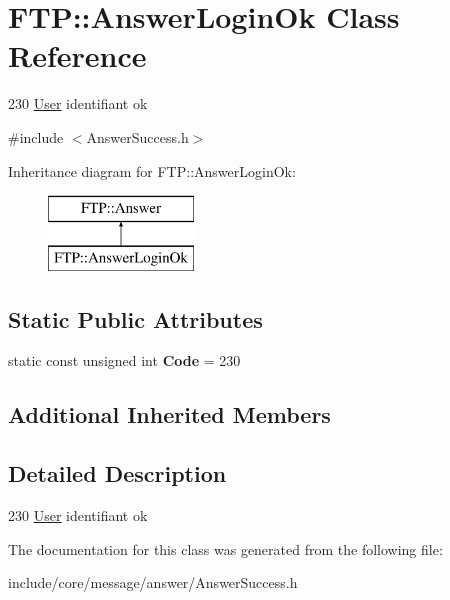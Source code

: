 \hypertarget{class_f_t_p_1_1_answer_login_ok}{\section{F\-T\-P\-:\-:Answer\-Login\-Ok Class Reference}
\label{class_f_t_p_1_1_answer_login_ok}
}


230 \hyperlink{struct_f_t_p_1_1_user}{User} identifiant ok  




{\ttfamily \#include $<$Answer\-Success.\-h$>$}

Inheritance diagram for F\-T\-P\-:\-:Answer\-Login\-Ok\-:\begin{figure}[H]
\begin{center}
\leavevmode
\includegraphics[height=2.000000cm]{class_f_t_p_1_1_answer_login_ok}
\end{center}
\end{figure}
\subsection*{Static Public Attributes}
\begin{DoxyCompactItemize}
\item 
\hypertarget{class_f_t_p_1_1_answer_login_ok_a5931c280d254e2cddbab352d225f2398}{static const unsigned int {\bfseries Code} = 230}\label{class_f_t_p_1_1_answer_login_ok_a5931c280d254e2cddbab352d225f2398}

\end{DoxyCompactItemize}
\subsection*{Additional Inherited Members}


\subsection{Detailed Description}
230 \hyperlink{struct_f_t_p_1_1_user}{User} identifiant ok 

The documentation for this class was generated from the following file\-:\begin{DoxyCompactItemize}
\item 
include/core/message/answer/Answer\-Success.\-h\end{DoxyCompactItemize}
